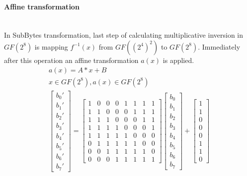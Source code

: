 \newpage
\paragraph{Affine transformation}\mbox{}\\
In SubBytes transformation, last step of calculating multiplicative inversion in $GF(2^8)$ is mapping $f^{-1}(x)$ from $GF((2^4)^2)$ to $GF(2^8)$. Immediately after this operation an affine transformation $a(x)$ is applied.
\begin{equation}
\begin{gathered}
\label{eq:affine}
a(x) = A * x + B\\
x \in GF(2^8), a(x) \in GF(2^8) \\
\begin{bmatrix}
b_0'\\b_1'\\b_2'\\b_3'\\b_4'\\b_5'\\b_6'\\b_7'
\end{bmatrix}
=
\begin{bmatrix}
    1 & 0 & 0 & 0 & 1 & 1 & 1 & 1 \\
    1 & 1 & 0 & 0 & 0 & 1 & 1 & 1 \\
    1 & 1 & 1 & 0 & 0 & 0 & 1 & 1 \\
    1 & 1 & 1 & 1 & 0 & 0 & 0 & 1 \\
    1 & 1 & 1 & 1 & 1 & 0 & 0 & 0 \\
    0 & 1 & 1 & 1 & 1 & 1 & 0 & 0 \\
    0 & 0 & 1 & 1 & 1 & 1 & 1 & 0 \\
    0 & 0 & 0 & 1 & 1 & 1 & 1 & 1
\end{bmatrix}
\begin{bmatrix}
b_0\\b_1\\b_2\\b_3\\b_4\\b_5\\b_6\\b_7
\end{bmatrix}
+
\begin{bmatrix}
1\\1\\0\\0\\0\\1\\1\\0
\end{bmatrix}
\end{gathered}
\end{equation}

